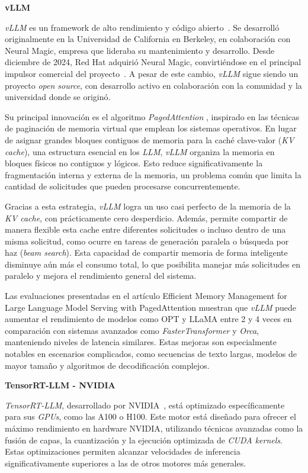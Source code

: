 \vspace{0.5cm}
\noindent \textbf{vLLM}

\textit{vLLM} es un framework de alto rendimiento y código abierto~\cite{ref11}. Se desarrolló originalmente en la Universidad de California en Berkeley, en colaboración con Neural Magic, empresa que lideraba su mantenimiento y desarrollo. Desde diciembre de 2024, Red Hat adquirió Neural Magic, convirtiéndose en el principal impulsor comercial del proyecto~\cite{ref12}. A pesar de este cambio, \textit{vLLM} sigue siendo un proyecto \textit{open source}, con desarrollo activo en colaboración con la comunidad y la universidad donde se originó.

Su principal innovación es el algoritmo \textit{PagedAttention} \cite{ref39}, inspirado en las técnicas de paginación de memoria virtual que emplean los sistemas operativos. En lugar de asignar grandes bloques contiguos de memoria para la caché clave-valor (\textit{KV cache}), una estructura esencial en los \textit{LLM}, \textit{vLLM} organiza la memoria en bloques físicos no contiguos y lógicos. Esto reduce significativamente la fragmentación interna y externa de la memoria, un problema común que limita la cantidad de solicitudes que pueden procesarse concurrentemente.

Gracias a esta estrategia, \textit{vLLM} logra un uso casi perfecto de la memoria de la \textit{KV cache}, con prácticamente cero desperdicio. Además, permite compartir de manera flexible esta cache entre diferentes solicitudes o incluso dentro de una misma solicitud, como ocurre en tareas de generación paralela o búsqueda por haz (\textit{beam search}). Esta capacidad de compartir memoria de forma inteligente disminuye aún más el consumo total, lo que posibilita manejar más solicitudes en paralelo y mejora el rendimiento general del sistema.

Las evaluaciones presentadas en el artículo Efficient Memory Management for Large Language Model Serving with PagedAttention \cite{ref39} muestran que \textit{vLLM} puede aumentar el rendimiento de modelos como OPT y LLaMA entre 2 y 4 veces en comparación con sistemas avanzados como \textit{FasterTransformer} y \textit{Orca}, manteniendo niveles de latencia similares. Estas mejoras son especialmente notables en escenarios complicados, como secuencias de texto largas, modelos de mayor tamaño y algoritmos de decodificación complejos.

\newpage
\noindent \textbf{TensorRT-LLM - NVIDIA}

\textit{TensorRT-LLM}, desarrollado por NVIDIA~\cite{ref12}, está optimizado específicamente para sus \textit{GPUs}, como las A100 o H100. Este motor está diseñado para ofrecer el máximo rendimiento en hardware NVIDIA, utilizando técnicas avanzadas como la fusión de capas, la cuantización y la ejecución optimizada de \textit{CUDA kernels}. Estas optimizaciones permiten alcanzar velocidades de inferencia significativamente superiores a las de otros motores más generales.

